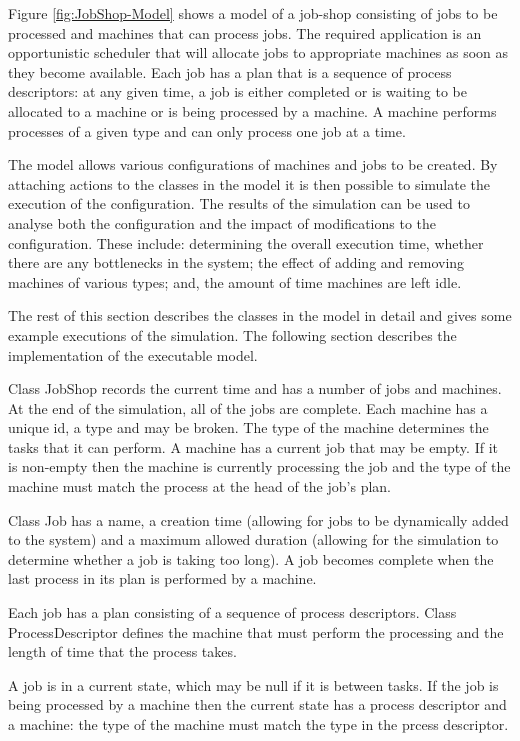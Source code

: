 Figure \ref{fig:JobShop-Model} shows a model of a job-shop consisting
of jobs to be processed and machines that can process jobs. The required
application is an opportunistic scheduler that will allocate jobs
to appropriate machines as soon as they become available. Each job
has a plan that is a sequence of process descriptors: at any given
time, a job is either completed or is waiting to be allocated to a
machine or is being processed by a machine. A machine performs processes
of a given type and can only process one job at a time. 

The model allows various configurations of machines and jobs to be
created. By attaching actions to the classes in the model it is then
possible to simulate the execution of the configuration. The results
of the simulation can be used to analyse both the configuration and
the impact of modifications to the configuration. These include: determining
the overall execution time, whether there are any bottlenecks in the
system; the effect of adding and removing machines of various types;
and, the amount of time machines are left idle.

The rest of this section describes the classes in the model in detail
and gives some example executions of the simulation. The following
section describes the implementation of the executable model.

Class JobShop records the current time and has a number of jobs and
machines. At the end of the simulation, all of the jobs are complete.
Each machine has a unique id, a type and may be broken. The type of
the machine determines the tasks that it can perform. A machine has
a current job that may be empty. If it is non-empty then the machine
is currently processing the job and the type of the machine must match
the process at the head of the job's plan. 

Class Job has a name, a creation time (allowing for jobs to be dynamically
added to the system) and a maximum allowed duration (allowing for
the simulation to determine whether a job is taking too long). A job
becomes complete when the last process in its plan is performed by
a machine. 

Each job has a plan consisting of a sequence of process descriptors.
Class ProcessDescriptor defines the machine that must perform the
processing and the length of time that the process takes. 

A job is in a current state, which may be null if it is between tasks.
If the job is being processed by a machine then the current state
has a process descriptor and a machine: the type of the machine must
match the type in the prcess descriptor.

